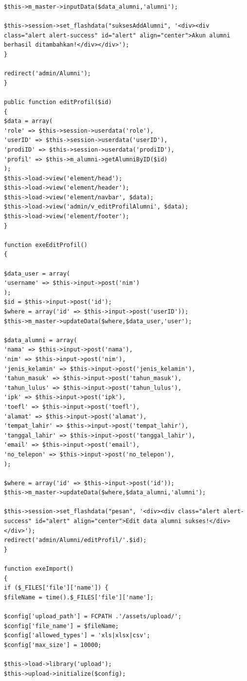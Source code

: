 \begin{verbatim}
$this->m_master->inputData($data_alumni,'alumni');

$this->session->set_flashdata("suksesAddAlumni", '<div><div class="alert alert-success" id="alert" align="center">Akun alumni berhasil ditambahkan!</div></div>');
}

redirect('admin/Alumni');
}

public function editProfil($id)
{
$data = array(
'role' => $this->session->userdata('role'),
'userID' => $this->session->userdata('userID'),
'prodiID' => $this->session->userdata('prodiID'),
'profil' => $this->m_alumni->getAlumniByID($id)
);
$this->load->view('element/head');
$this->load->view('element/header');
$this->load->view('element/navbar', $data);
$this->load->view('admin/v_editProfilAlumni', $data);
$this->load->view('element/footer');
}

function exeEditProfil()
{

$data_user = array(
'username' => $this->input->post('nim')
);
$id = $this->input->post('id');
$where = array('id' => $this->input->post('userID'));
$this->m_master->updateData($where,$data_user,'user');

$data_alumni = array(
'nama' => $this->input->post('nama'),
'nim' => $this->input->post('nim'),
'jenis_kelamin' => $this->input->post('jenis_kelamin'),
'tahun_masuk' => $this->input->post('tahun_masuk'),
'tahun_lulus' => $this->input->post('tahun_lulus'),
'ipk' => $this->input->post('ipk'),
'toefl' => $this->input->post('toefl'),
'alamat' => $this->input->post('alamat'),
'tempat_lahir' => $this->input->post('tempat_lahir'),
'tanggal_lahir' => $this->input->post('tanggal_lahir'),
'email' => $this->input->post('email'),
'no_telepon' => $this->input->post('no_telepon'),
);

$where = array('id' => $this->input->post('id'));
$this->m_master->updateData($where,$data_alumni,'alumni');

$this->session->set_flashdata("pesan", '<div><div class="alert alert-success" id="alert" align="center">Edit data alumni sukses!</div></div>');
redirect('admin/Alumni/editProfil/'.$id);
}

function exeImport()
{
if ($_FILES['file']['name']) {
$fileName = time().$_FILES['file']['name'];

$config['upload_path'] = FCPATH .'/assets/upload/';
$config['file_name'] = $fileName;
$config['allowed_types'] = 'xls|xlsx|csv';
$config['max_size'] = 10000;

$this->load->library('upload');
$this->upload->initialize($config);


\end{verbatim}
